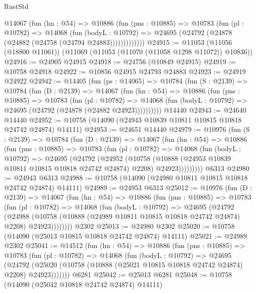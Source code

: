 \begin{lexlean}{RustStd}
\begin{coremodule}
          @14067
            (fun (hn : @54) =>
            @10886
              (fun (pns : @10885) =>
              @10783
                (fun (pl : @10782) =>
                @14068
                  (fun (bodyL : @10792) =>
                  @24695 (@24792 (@24878 (@24882 (@24758 (@24794 @24883)))))))))))))
@24915 := @11053 (@11056 (@18800 @11061)) (@11069 (@11053 (@11070 (@11058 @1298 @11072)) @10836))
@24916 := @24905 @24915
@24918 := @24756 (@10849 @24915)
@24919 := @10758 @24918
@24922 := @10856 @24915 @24793 @24883
@24923 := @24919 @24922
@24942 := @14405
    (fun (ps : @14065) =>
    @10784
      (fun (S : @2139) =>
      @10784
        (fun (D : @2139) =>
        @14067
          (fun (hn : @54) =>
          @10886
            (fun (pns : @10885) =>
            @10783
              (fun (pl : @10782) =>
              @14068 (fun (bodyL : @10792) => @24695 (@24792 (@24878 (@24882 @24923))))))))))
    @14440
@24943 := @24640 @14440
@24952 := @10758 (@14090 (@24943 @10839 @10811 @10815 @10818 @24742 @24874) @14111)
@24953 := @24651 @14440
@24979 := @10976
    (fun (S : @2139) =>
    @10784
      (fun (D : @2139) =>
      @14067
        (fun (hn : @54) =>
        @10886
          (fun (pns : @10885) =>
          @10783
            (fun (pl : @10782) =>
            @14068
              (fun (bodyL : @10792) =>
              @24695
                (@24792
                  (@24952
                    (@10758
                      (@10888 (@24953 @10839 @10811 @10815 @10818 @24742 @24874) @2208)
                      @24923)))))))))
    @6313
@24980 := @24943 @6313
@24988 := @10758 (@14090 (@24980 @10811 @10815 @10818 @24742 @24874) @14111)
@24989 := @24953 @6313
@25012 := @10976
    (fun (D : @2139) =>
    @14067
      (fun (hn : @54) =>
      @10886
        (fun (pns : @10885) =>
        @10783
          (fun (pl : @10782) =>
          @14068
            (fun (bodyL : @10792) =>
            @24695
              (@24792
                (@24988
                  (@10758 (@10888 (@24989 @10811 @10815 @10818 @24742 @24874) @2208) @24923))))))))
    @2302
@25013 := @24980 @2302
@25020 := @10758 (@14090 (@25013 @10815 @10818 @24742 @24874) @14111)
@25021 := @24989 @2302
@25041 := @14512
    (fun (hn : @54) =>
    @10886
      (fun (pns : @10885) =>
      @10783
        (fun (pl : @10782) =>
        @14068
          (fun (bodyL : @10792) =>
          @24695
            (@24792
              (@25020 (@10758 (@10888 (@25021 @10815 @10818 @24742 @24874) @2208) @24923)))))))
    @6281
@25042 := @25013 @6281
@25048 := @10758 (@14090 (@25042 @10818 @24742 @24874) @14111)

\end{coremodule}
\end{lexlean}

